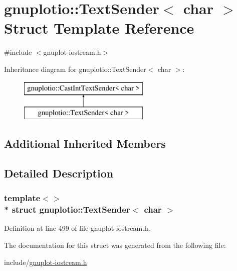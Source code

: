 \hypertarget{structgnuplotio_1_1_text_sender_3_01char_01_4}{}\section{gnuplotio\+:\+:Text\+Sender$<$ char $>$ Struct Template Reference}
\label{structgnuplotio_1_1_text_sender_3_01char_01_4}


{\ttfamily \#include $<$gnuplot-\/iostream.\+h$>$}

Inheritance diagram for gnuplotio\+:\+:Text\+Sender$<$ char $>$\+:\begin{figure}[H]
\begin{center}
\leavevmode
\includegraphics[height=2.000000cm]{structgnuplotio_1_1_text_sender_3_01char_01_4}
\end{center}
\end{figure}
\subsection*{Additional Inherited Members}


\subsection{Detailed Description}
\subsubsection*{template$<$$>$\\*
struct gnuplotio\+::\+Text\+Sender$<$ char $>$}



Definition at line 499 of file gnuplot-\/iostream.\+h.



The documentation for this struct was generated from the following file\+:\begin{DoxyCompactItemize}
\item 
include/\hyperlink{gnuplot-iostream_8h}{gnuplot-\/iostream.\+h}\end{DoxyCompactItemize}
